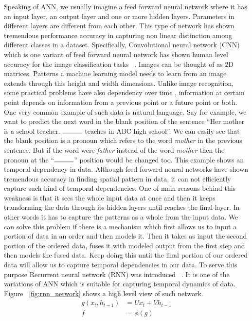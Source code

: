 \documentclass[10pt,twocolumn,letterpaper]{article}
\begin{document}
Speaking of ANN, we usually imagine a feed forward neural network where it has an input layer, an output layer and one or more hidden layers. Parameters in different layers are different from each other. This type of network has shown tremendous performance accuracy in capturing non linear distinction among different classes in a dataset. Specifically, Convolutional neural network (CNN) which is one variant of feed forward neural network has shown human level accuracy for the image classification tasks ~\cite{NIPS2012_4824}. Images can be thought of as $2$D matrices. Patterns a machine learning model needs to learn from an image extends through this height and width dimensions. Unlike image recognition, some practical problems have also dependency over time \ie, information at certain point depends on information from a previous point or a future point or both. One very common example of such data is natural language. Say for example, we want to predict the next word in the blank position of the sentence ``Her mother is a school teacher. $\rule{1cm}{0.15mm}$ teaches in ABC high school''. We can easily see that the blank position is a pronoun which refers to the word \emph{mother} in the previous sentence. But if the word were \emph{father} instead of the word \emph{mother} then the pronoun at the ``$\rule{1cm}{0.15mm}$'' position would be changed too. This example shows an temporal dependency in data. Although feed forward neural networks have shown tremendous accuracy in finding spatial pattern in data, it can not efficiently capture such kind of temporal dependencies. One of main reasons behind this weakness is that it sees the whole input data at once and then it keeps transforming the data through its hidden layers until reaches the final layer. In other words it has to capture the patterns as a whole from the input data. We can solve this problem if there is a mechanism which first allows us to input a portion of data in an order and then models it. Then it takes as input the second portion of the ordered data, fuses it with modeled output from the first step and then models the fused data. Keep doing this until the final portion of our ordered data will allow us to capture temporal dependencies in our data. To serve this purpose Recurrent neural network (RNN) was introduced ~\cite{DBLP:journals/corr/Lipton15}. It is one of the variations of ANN which is suitable for capturing temporal dynamics of data. Figure ~\ref{fig:rnn_network} shows a high level view of such network. 
\begin{equation}
\label{eq:rnn_eq}
\begin{aligned}
	g(x_t, h_{t-1}) & = Ux_t + Vh_{t-1} \\ f & = \phi(g)
\end{aligned}
\end{equation}
\end{document}
